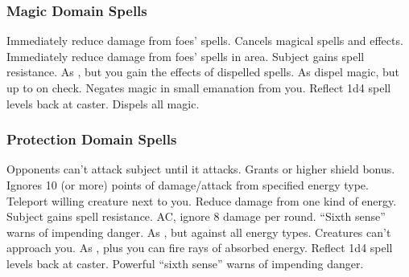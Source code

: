 \subsubsection{Magic Domain Spells}

\begin{spelllist}
     Immediately reduce damage from foes' spells.
    \spellhead[1]{}
    \spellhead[2]{}
    \spellhead[2]{}
     Cancels magical spells and effects.
     Immediately reduce damage from foes' spells in area.
    \spellhead[4]{}
     Subject gains spell resistance.
    \spellhead[5]{}
     As , but you gain the effects of dispelled spells.
    \spellhead[6]{}
     As dispel magic, but up to  on check.
     Negates magic in small emanation from you.
     Reflect 1d4 spell levels back at caster.
    \spellhead[8]{}
    \spellhead[8]{}
     Dispels all magic.
    \spellhead[9]{}
\end{spelllist}

\subsubsection{Protection Domain Spells}

\begin{spelllist}
     Opponents can't attack subject until it attacks.
     Grants  or higher shield bonus.
     Ignores 10 (or more) points of damage/attack from specified energy type.
     Teleport willing creature next to you.
     Reduce damage from one kind of energy.
    \spellhead[3]{}
     Subject gains spell resistance.
      AC, ignore 8 damage per round.
    \spellhead[5]{}
     ``Sixth sense'' warns of impending danger.
     As , but against all energy types.
     Creatures can't approach you.
     As , plus you can fire rays of absorbed energy.
     Reflect 1d4 spell levels back at caster.
    \spellhead[8]{}
    \spellhead[8]{}
     Powerful ``sixth sense'' warns of impending danger.
    \spellhead[9]{}
\end{spelllist}

